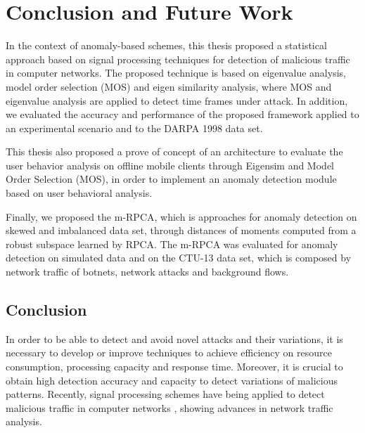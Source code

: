 \chapter{Conclusion and Future Work}
\label{ch:5_conclusionfuturework}


In the context of anomaly-based schemes, this thesis proposed a statistical approach based on signal processing techniques for detection of malicious traffic in computer networks. The proposed technique is based on eigenvalue analysis, model order selection (MOS) and eigen similarity analysis, where MOS and eigenvalue analysis are applied to detect time frames under attack. In addition, we evaluated the accuracy and performance of the proposed framework applied to an experimental scenario and to the DARPA 1998 data set. 

This thesis also proposed a prove of concept of an architecture to evaluate the user behavior analysis on offline mobile clients through Eigensim and Model Order Selection (MOS), in order to implement an anomaly detection module based on user behavioral analysis.

Finally, we proposed the m-RPCA, which is approaches for anomaly detection on skewed and imbalanced data set, through distances of moments computed from a robust subspace learned by RPCA. The m-RPCA was evaluated for anomaly detection on simulated data and on the CTU-13 data set, which is composed by network traffic of botnets, network attacks and background flows.

\section{Conclusion}
\label{sc:conc_conclusion}

In order to be able to detect and avoid novel attacks and their variations, it is necessary to develop or improve techniques to achieve efficiency on resource consumption, processing capacity and response time. Moreover, it is crucial to obtain high detection accuracy and capacity to detect variations of malicious patterns. Recently, signal processing schemes have being applied to detect malicious traffic in computer networks \cite{Lu2009,Huang2009,Zonglin2009,david2011blind,da2012improved,tenorio2013greatest, vieira2017model}, showing advances in network traffic analysis.


